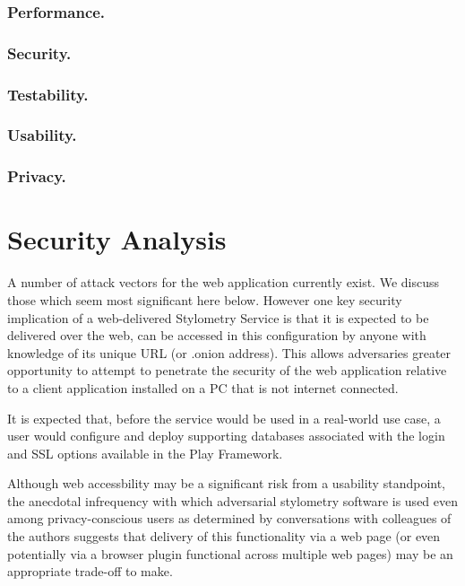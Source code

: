 \documentclass[letterpaper]{article}
\begin{document}
\subsubsection{Performance.}

\subsubsection{Security.}


\subsubsection{Testability.}


\subsubsection{Usability.}

\subsubsection{Privacy.}


\section{Security Analysis}

A number of attack vectors for the web application currently exist. We
discuss those which seem most significant here below. However one key
security implication of a web-delivered Stylometry Service is that it
is expected to be delivered over the web, can be accessed in this configuration by anyone with knowledge of its unique URL (or .onion
address). This allows adversaries greater opportunity to attempt to
penetrate the security of the web application relative to a client
application installed on a PC that is not internet connected.

It is expected that, before the service would be used in a real-world
use case, a user would configure and deploy supporting databases
associated with the login and SSL options available in the
Play Framework.

Although web accessbility may be a significant risk from a usability
standpoint, the anecdotal infrequency with which adversarial
stylometry software is used even among privacy-conscious users as
determined by conversations with colleagues of the authors
suggests that delivery of this functionality via a web page (or even
potentially via a browser plugin functional across multiple web pages)
may be an appropriate trade-off to make.
\end{document}

